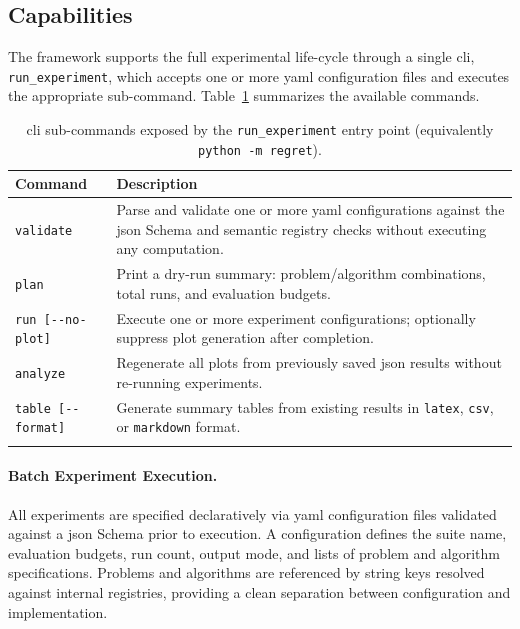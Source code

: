 \subsection{Capabilities}
The framework supports the full experimental life-cycle through a single
\acrfull{cli}, \texttt{run\_experiment}, which accepts one or more
\acrshort{yaml} configuration files and executes the appropriate sub-command.
Table~\ref{tab:cli-commands} summarizes the available commands.

\small
\begin{longtable}{p{3.8cm}p{9.2cm}}
  \hline
  \textbf{Command} & \textbf{Description} \\
  \hline
  \texttt{validate} &
  Parse and validate one or more \acrshort{yaml} configurations
  against the \acrshort{json} Schema and
  semantic registry checks without executing any computation. \\[4pt]
  \texttt{plan} &
  Print a dry-run summary: problem/algorithm combinations, total runs, and
  evaluation budgets. \\[4pt]
  \texttt{run [\texttt{-{}-no-plot}]} &
  Execute one or more experiment configurations; optionally suppress plot
  generation after completion. \\[4pt]
  \texttt{analyze} &
  Regenerate all plots from previously saved \acrshort{json} results without
  re-running experiments. \\[4pt]
  \texttt{table [\texttt{-{}-format}]} &
  Generate summary tables from existing results in \texttt{latex},
  \texttt{csv}, or \texttt{markdown} format. \\
  \hline
  \caption[CLI sub-commands]{\acrshort{cli} sub-commands exposed by the
    \texttt{run\_experiment} entry
  point (equivalently \texttt{python -m regret}).}
  \label{tab:cli-commands}
\end{longtable}

\paragraph{Batch Experiment Execution.}
All experiments are specified declaratively via \acrshort{yaml}
configuration files
validated against a \acrshort{json} Schema prior to execution. A
configuration defines
the suite name, evaluation budgets, run count, output mode, and lists of
problem and algorithm specifications. Problems and algorithms are referenced
by string keys resolved against internal registries, providing a clean
separation between configuration and implementation.


